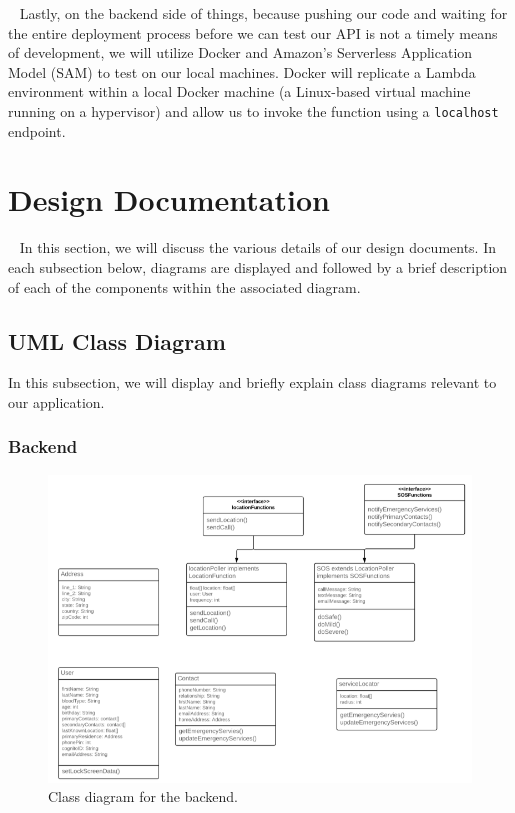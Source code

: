 \documentclass[10pt, a4paper]{article}
\begin{document}
\par ~ Lastly, on the backend side of things, because pushing our code and waiting for the entire deployment process before we can test our API is not a timely means of development, we will utilize Docker and Amazon's Serverless Application Model (SAM) \cite{five} to test on our local machines. Docker will replicate a Lambda environment within a local Docker machine (a Linux-based virtual machine running on a hypervisor) and allow us to invoke the function using a \texttt{localhost} endpoint.

\newpage

\section{Design Documentation}
\par ~ In this section, we will discuss the various details of our design documents. In each subsection below, diagrams are displayed and followed by a brief description of each of the components within the associated diagram.

\subsection{UML Class Diagram}
In this subsection, we will display and briefly explain class diagrams relevant to our application.
\subsubsection{Backend}
\begin{figure}[H]
  \centerline{
  	\includegraphics[scale=1.3]{diagrams/backend-class.png}
  }  
  \caption{Class diagram for the backend.}
\end{figure}
\end{document}
